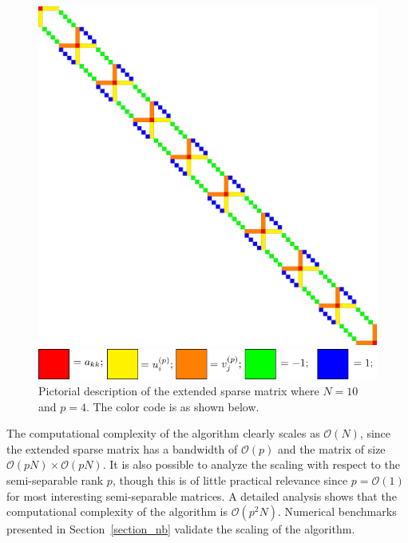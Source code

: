 \documentclass[times]{nlaauth}
\begin{document}
\begin{figure}[!htbp]
\begin{center}
\includegraphics[scale=0.175]{./images/mtermsemiseparable_matrix.pdf}
\end{center}
\caption{Pictorial description of the extended sparse matrix where $N=10$ and $p=4$. The color code is as shown below.}
\begin{center}
\includegraphics[scale=0.5]{./images/colorcode.pdf}
\end{center}
\label{fig_rankm_semiseparable}
\end{figure}

The computational complexity of the algorithm clearly scales as $\mathcal{O}(N)$, since the extended sparse matrix has a bandwidth of $\mathcal{O}(p)$ and the matrix of size $\mathcal{O}(pN) \times \mathcal{O}(pN)$. It is also possible to analyze the scaling with respect to the semi-separable rank $p$, though this is of little practical relevance since $p = \mathcal{O}(1)$ for most interesting semi-separable matrices. A detailed analysis shows that the computational complexity of the algorithm is $\mathcal{O}(p^2N)$. Numerical benchmarks presented in Section~\ref{section_nb} validate the scaling of the algorithm.
\end{document}
